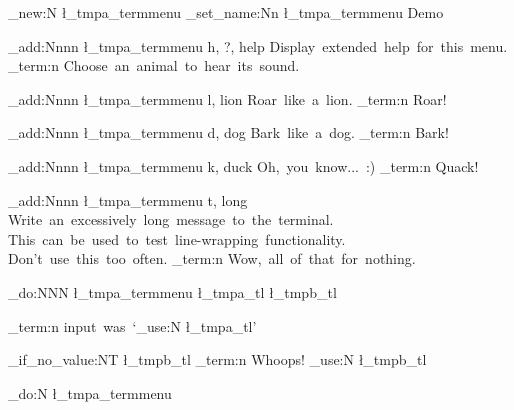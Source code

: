  \relax \ExplSyntaxOn
 \relax %

\termmenu_new:N \l_tmpa_termmenu
\termmenu_set_name:Nn \l_tmpa_termmenu { Demo }
 
\termmenu_add:Nnnn \l_tmpa_termmenu { h, ?, help }
  { Display~extended~help~for~this~menu. }
  { \msg_term:n { Choose~an~animal~to~hear~its~sound. } }
 
\termmenu_add:Nnnn \l_tmpa_termmenu { l, lion }
  { Roar~like~a~lion. }
  { \msg_term:n { Roar! } }
 
\termmenu_add:Nnnn \l_tmpa_termmenu { d, dog }
  { Bark~like~a~dog. }
  { \msg_term:n { Bark! } }
 
\termmenu_add:Nnnn \l_tmpa_termmenu { k, duck }
  { Oh,~you~know...~:) }
  { \msg_term:n { Quack! } }

\termmenu_add:Nnnn \l_tmpa_termmenu { t, long }
  {
    Write~an~excessively~long~message~to~the~terminal.~
    This~can~be~used~to~test~line-wrapping~functionality.~
    Don't~use~this~too~often.
  }
  { \msg_term:n { Wow,~all~of~that~for~nothing. } }

\termmenu_do:NNN \l_tmpa_termmenu \l_tmpa_tl \l_tmpb_tl

\msg_term:n { input~was~`\tl_use:N \l_tmpa_tl' }

\quark_if_no_value:NT \l_tmpb_tl
  { \msg_term:n { Whoops! } }
  { \tl_use:N \l_tmpb_tl }

\termmenu_do:N \l_tmpa_termmenu

\bye
